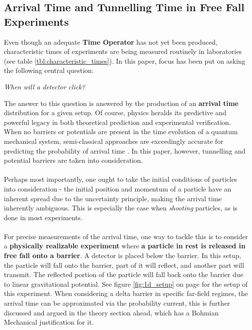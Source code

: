 \subsection{Arrival Time and Tunnelling Time in Free Fall Experiments}
\label{ap:arrivaltimetunnelingtime}

Even though an adequate \textbf{Time Operator} has not yet been produced, characteristic times of experiments are being measured routinely in laboratories (see table \ref{tbl:characteristic_times}). In this paper, focus has been put on asking the following central question:
\begin{center}
    \textit{When will a detector click?}
\end{center}
The answer to this question is answered by the production of an \textbf{arrival time} distribution for a given setup. Of course, physics heralds its predictive and powerful legacy in both theoretical prediction and experimental verification. When no barriers or potentials are present in the time evolution of a quantum mechanical system, semi-classical approaches are exceedingly accurate for predicting the probability of arrival time \cite{paper:semiclassical}. In this paper, however, tunnelling and potential barriers are taken into consideration.
\\\\
Perhaps most importantly, one ought to take the initial conditions of particles into consideration - the initial position and momentum of a particle have an inherent spread due to the uncertainty principle, making the arrival time inherently ambiguous. This is especially the case when \textit{shooting} particles, as is done in most experiments.
\\\\
For precise measurements of the arrival time, one way to tackle this is to consider a \textbf{physically realizable experiment} where \textbf{a particle in rest is released in free fall onto a barrier}. A detector is placed below the barrier. In this setup, the particle will fall onto the barrier, part of it will reflect, and another part will transmit. The reflected portion of the particle will fall back onto the barrier due to linear gravitational potential. See figure \ref{fig:1d_setup} on page \pageref{fig:1d_setup} for the setup of this experiment. When considering a delta barrier in specific far-field regimes, the arrival time can be approximated via the probability current, this is further discussed and argued in the theory section ahead, which has a Bohmian Mechanical justification for it.\\\\
